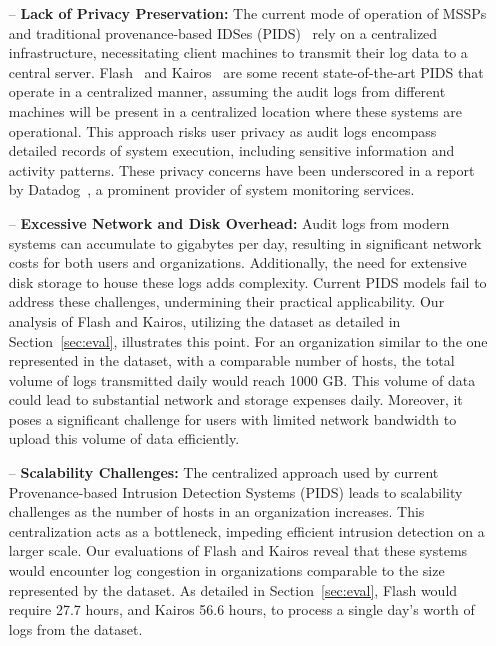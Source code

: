 \begin{itemize} [leftmargin=*]
    \item[--] \textbf{Lack of Privacy Preservation:} The current mode of operation of MSSPs and traditional provenance-based IDSes (PIDS)~\cite{flash2024,cheng2023kairos,wang2022threatrace} rely on a centralized infrastructure, necessitating client machines to transmit their log data to a central server. Flash~\cite{flash2024} and Kairos~\cite{cheng2023kairos} are some recent state-of-the-art PIDS that operate in a centralized manner, assuming the audit logs from different machines will be present in a centralized location where these systems are operational. This approach risks user privacy as audit logs encompass detailed records of system execution, including sensitive information and activity patterns. These privacy concerns have been underscored in a report by Datadog~\cite{datadog}, a prominent provider of system monitoring services.
    
    \item[--] \textbf{Excessive Network and Disk Overhead:} Audit logs from modern systems can accumulate to gigabytes per day, resulting in significant network costs for both users and organizations. Additionally, the need for extensive disk storage to house these logs adds complexity. Current PIDS models fail to address these challenges, undermining their practical applicability. Our analysis of Flash and Kairos, utilizing the \optc dataset as detailed in Section~\ref{sec:eval}, illustrates this point. For an organization similar to the one represented in the \optc dataset, with a comparable number of hosts, the total volume of logs transmitted daily would reach 1000 GB. This volume of data could lead to substantial network and storage expenses daily. Moreover, it poses a significant challenge for users with limited network bandwidth to upload this volume of data efficiently.
    
    \item[--] \textbf{Scalability Challenges:} The centralized approach used by current Provenance-based Intrusion Detection Systems (PIDS) leads to scalability challenges as the number of hosts in an organization increases. This centralization acts as a bottleneck, impeding efficient intrusion detection on a larger scale. Our evaluations of Flash and Kairos reveal that these systems would encounter log congestion in organizations comparable to the size represented by the \optc dataset. As detailed in Section~\ref{sec:eval}, Flash would require 27.7 hours, and Kairos 56.6 hours, to process a single day's worth of logs from the \optc dataset. %
\end{itemize}

